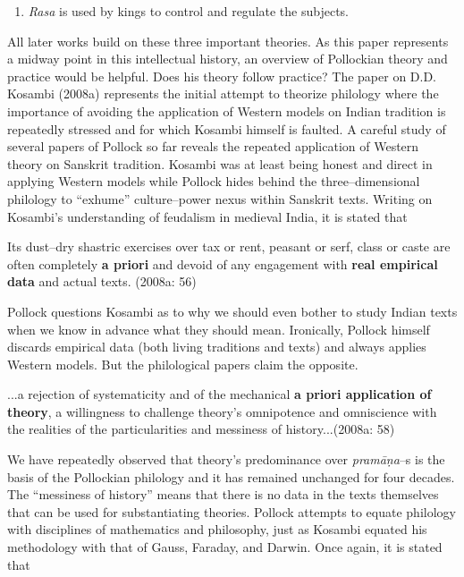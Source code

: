{{\begin{enumerate}
 \item \textit{Rasa} is used by kings to control and regulate the subjects.

\end{enumerate}

\vspace{-.2cm}

All later works build on these three important theories. As this paper represents a midway point in this intellectual history, an overview of Pollockian theory and practice would be helpful. Does his theory follow practice? The paper on D.D. Kosambi (2008a) represents the initial attempt to theorize philology where the importance of avoiding the application of Western models on Indian tradition is repeatedly stressed and for which Kosambi himself is faulted. A careful study of several papers of Pollock so far reveals the repeated application of Western theory on Sanskrit tradition. Kosambi was at least being honest and direct in applying Western models while Pollock hides behind the three–dimensional philology to “exhume” culture–power nexus within Sanskrit texts. Writing on Kosambi’s understanding of feudalism in medieval India, it is stated that

\begin{myquote}
Its dust–dry shastric exercises over tax or rent, peasant or serf, class or caste are often completely \textbf{a priori} and devoid of any engagement with \textbf{real empirical data} and actual texts. (2008a: 56)
\end{myquote}

Pollock questions Kosambi as to why we should even bother to study Indian texts when we know in advance what they should mean. Ironically, Pollock himself discards empirical data (both living traditions and texts) and always applies Western models. But the philological papers claim the opposite.

\begin{myquote}
...a rejection of systematicity and of the mechanical \textbf{a priori application of theory}, a willingness to challenge theory’s omnipotence and omniscience with the realities of the particularities and messiness of history...(2008a: 58)
\end{myquote}

We have repeatedly observed that theory’s predominance over \textit{pramāṇa}–s is the basis of the Pollockian philology and it has remained unchanged for four decades. The “messiness of history” means that there is no data in the texts themselves that can be used for substantiating theories. Pollock attempts to equate philology with disciplines of mathematics and philosophy, just as Kosambi equated his methodology with that of Gauss, Faraday, and Darwin. Once again, it is stated that

}}
